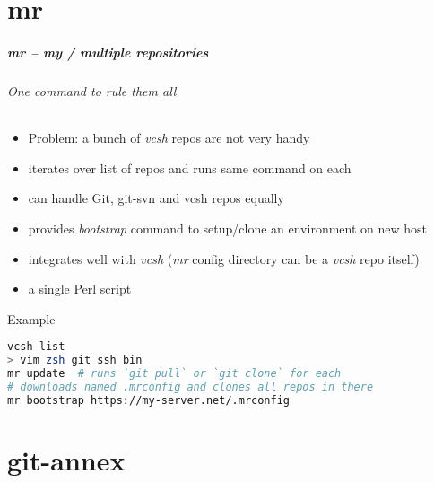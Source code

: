 \documentclass[english,hyperref={pdfpagelabels=false},aspectratio=169]{beamer}
\begin{document}
\part{mr}
\makepart

\begin{frame}[label=mr,fragile]
  \frametitle{mr -- my / multiple repositories}
  \framesubtitle{One command to rule them all}
  \begin{itemize}
    \item Problem: a bunch of \textit{vcsh} repos are not very handy
    \item iterates over list of repos and runs same command on each
    \item can handle Git, git-svn and vcsh repos equally
    \item provides \textit{bootstrap} command to setup/clone an environment on new host
    \item integrates well with \textit{vcsh} {\scriptsize\color{fzjgray50}(\textit{mr} config directory can be a \textit{vcsh} repo itself)}
    \item a single Perl script
  \end{itemize}
  \begin{block}{Example}
    \vspace{-0.75em}
    \begin{lstlisting}[language=zsh]
vcsh list
> vim zsh git ssh bin
mr update  # runs `git pull` or `git clone` for each
# downloads named .mrconfig and clones all repos in there
mr bootstrap https://my-server.net/.mrconfig
    \end{lstlisting}
    \vspace{-0.75em}
  \end{block}
\end{frame}


\part{git-annex}
\makepart
\end{document}
